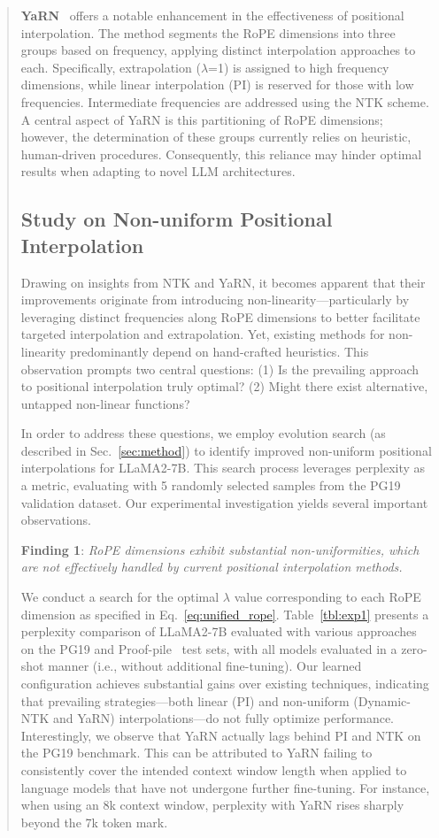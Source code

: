 \begin{abstract}
\textbf{YaRN}~\cite{yarn} offers a notable enhancement in the effectiveness of positional interpolation. The method segments the RoPE dimensions into three groups based on frequency, applying distinct interpolation approaches to each. Specifically, extrapolation ($\lambda$=1) is assigned to high frequency dimensions, while linear interpolation (PI) is reserved for those with low frequencies. Intermediate frequencies are addressed using the NTK scheme. A central aspect of YaRN is this partitioning of RoPE dimensions; however, the determination of these groups currently relies on heuristic, human-driven procedures. Consequently, this reliance may hinder optimal results when adapting to novel LLM architectures.

\subsection{Study on Non-uniform Positional Interpolation}

Drawing on insights from NTK and YaRN, it becomes apparent that their improvements originate from introducing non-linearity—particularly by leveraging distinct frequencies along RoPE dimensions to better facilitate targeted interpolation and extrapolation. Yet, existing methods for non-linearity predominantly depend on hand-crafted heuristics. This observation prompts two central questions: (1) Is the prevailing approach to positional interpolation truly optimal? (2) Might there exist alternative, untapped non-linear functions?

In order to address these questions, we employ evolution search (as described in Sec.~\ref{sec:method}) to identify improved non-uniform positional interpolations for LLaMA2-7B. This search process leverages perplexity as a metric, evaluating with 5 randomly selected samples from the PG19~\cite{pg19} validation dataset. Our experimental investigation yields several important observations.

\textbf{Finding 1}: \textit{RoPE dimensions exhibit substantial non-uniformities, which are not effectively handled by current positional interpolation methods.}

We conduct a search for the optimal $\lambda$ value corresponding to each RoPE dimension as specified in Eq.~\ref{eq:unified_rope}. Table~\ref{tbl:exp1} presents a perplexity comparison of LLaMA2-7B evaluated with various approaches on the PG19 and Proof-pile~\cite{proof-pile} test sets, with all models evaluated in a zero-shot manner (i.e., without additional fine-tuning). Our learned configuration achieves substantial gains over existing techniques, indicating that prevailing strategies—both linear (PI) and non-uniform (Dynamic-NTK and YaRN) interpolations—do not fully optimize performance. Interestingly, we observe that YaRN actually lags behind PI and NTK on the PG19 benchmark. This can be attributed to YaRN failing to consistently cover the intended context window length when applied to language models that have not undergone further fine-tuning. For instance, when using an 8k context window, perplexity with YaRN rises sharply beyond the 7k token mark.


\end{abstract}

